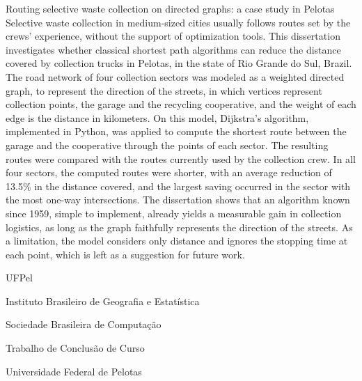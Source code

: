 \documentclass[diss,capa]{texufpel}
\begin{document}
\begin{englishabstract}{Routing selective waste collection on directed graphs: a case study in Pelotas}
Selective waste collection in medium-sized cities usually follows routes set
by the crews' experience, without the support of optimization tools. This
dissertation investigates whether classical shortest path algorithms can reduce the
distance covered by collection trucks in Pelotas, in the state of Rio Grande
do Sul, Brazil. The road network of four collection sectors was modeled as a
weighted directed graph, to represent the direction of the streets, in
which vertices represent collection points, the garage and
the recycling cooperative, and the weight of each edge is the distance in
kilometers. On this model, Dijkstra's algorithm, implemented in Python, was
applied to compute the shortest route between the garage and the cooperative
through the points of each sector. The resulting routes were compared with
the routes currently used by the collection crew. In all four sectors, the
computed routes were shorter, with an average reduction of 13.5\% in the
distance covered, and the largest saving occurred in the sector with the most
one-way intersections. The dissertation shows that an algorithm known since 1959,
simple to implement, already yields a measurable gain in collection
logistics, as long as the graph faithfully represents the direction of the
streets. As a limitation, the model considers only distance and ignores the
stopping time at each point, which is left as a suggestion for future work.
\end{englishabstract}

\listoffigures
\listofquadros   %
\listoftables

\begin{listofabbrv}{UFPel}
  \item[IBGE]  Instituto Brasileiro de Geografia e Estatística
  \item[SBC]   Sociedade Brasileira de Computação
  \item[TCC]   Trabalho de Conclusão de Curso
  \item[UFPel] Universidade Federal de Pelotas
\end{listofabbrv}
\end{document}
